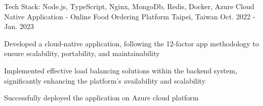 

\begin{cventries}


  \cventry
    {\color{awesome}Tech Stack: Node.js, TypeScript, Nginx, MongoDb, Redis, Docker, Azure} %
    {Cloud Native Application - Online Food Ordering Platform} %
    {Taipei, Taiwan} %
    {Oct. 2022 - Jan. 2023} %
    {
      \begin{cvitems} %
        \item {Developed a cloud-native application, following the 12-factor app methodology to ensure scalability, portability, and maintainability}
        \item {Implemented effective load balancing solutions within the backend system, significantly enhancing the platform's availability and scalability}
        \item {Successfully deployed the application on Azure cloud platform}
      \end{cvitems}
    }

  \vspace{12pt}



\end{cventries}
